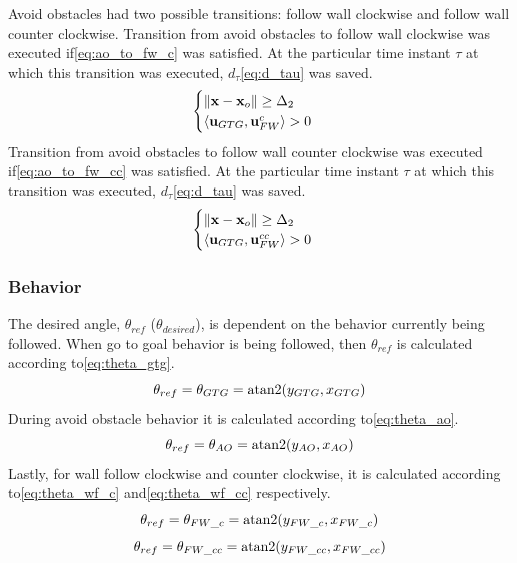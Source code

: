 Avoid obstacles had two possible transitions: follow wall clockwise and follow wall counter clockwise.
Transition from avoid obstacles to follow wall clockwise was executed if\:\eqref{eq:ao_to_fw_c} was satisfied. At the particular time instant $\tau$ at which this transition was executed, $d_{\tau}$\:\eqref{eq:d_tau} was saved.
\begin{equation}
    \label{eq:ao_to_fw_c}
    \begin{cases}
        \left\lVert \mathbf{x} - \mathbf{x}_o \right\rVert \ge \Delta_2 \\
        \langle \mathbf{u}_{GTG} , \mathbf{u}_{FW}^{c} \rangle > 0
    \end{cases}
\end{equation}
Transition from avoid obstacles to follow wall counter clockwise was executed if\:\eqref{eq:ao_to_fw_cc} was satisfied. At the particular time instant $\tau$ at which this transition was executed, $d_{\tau}$\:\eqref{eq:d_tau} was saved.
\begin{equation}
    \label{eq:ao_to_fw_cc}
    \begin{cases}
        \left\lVert \mathbf{x} - \mathbf{x}_o \right\rVert \ge \Delta_2 \\
        \langle \mathbf{u}_{GTG} , \mathbf{u}_{FW}^{cc} \rangle > 0
    \end{cases}
\end{equation}




\subsubsection{Behavior}
The desired angle, $\theta_{ref}$ ($\theta_{desired}$), is dependent on the behavior currently being followed. When go to goal behavior is being followed, then $\theta_{ref}$ is calculated according to\:\eqref{eq:theta_gtg}. 
\begin{equation}
    \label{eq:theta_gtg}
    \theta_{ref} = \theta_{GTG} = \operatorname{atan2}(y_{GTG}, x_{GTG})
\end{equation}
During avoid obstacle behavior it is calculated according to\:\eqref{eq:theta_ao}. 
\begin{equation}
    \label{eq:theta_ao}
    \theta_{ref} = \theta_{AO} = \operatorname{atan2}(y_{AO}, x_{AO})
\end{equation}
Lastly, for wall follow clockwise and counter clockwise, it is calculated according to\:\eqref{eq:theta_wf_c} and\:\eqref{eq:theta_wf_cc} respectively.
\begin{equation}
    \label{eq:theta_wf_c}
    \theta_{ref} = \theta_{FW\_c} = \operatorname{atan2}(y_{FW\_c}, x_{FW\_c})
\end{equation}
\begin{equation}
    \label{eq:theta_wf_cc}
    \theta_{ref} = \theta_{FW\_cc} = \operatorname{atan2}(y_{FW\_cc}, x_{FW\_cc})
\end{equation}

